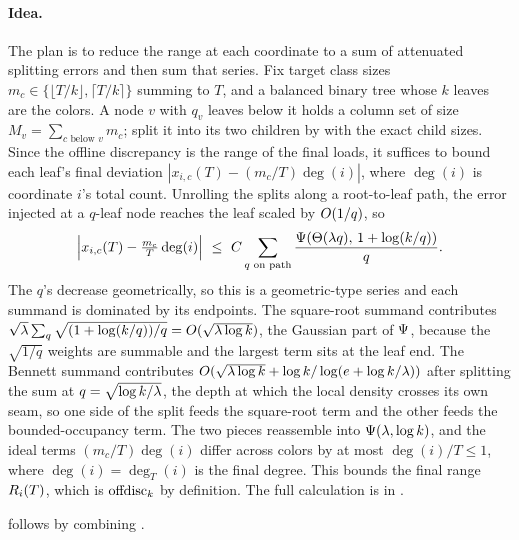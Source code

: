 \paragraph{Idea.}
The plan is to reduce the range at each coordinate to a sum of attenuated splitting errors and then sum that series.
Fix target class sizes $m_c\in\{\lfloor T/k\rfloor,\lceil T/k\rceil\}$ summing to $T$, and a balanced binary tree whose $k$
leaves are the colors. A node $v$ with $q_v$ leaves below it holds a column set of size $M_v=\sum_{c\text{ below }v}m_c$;
split it into its two children by  with the exact child sizes. Since the offline discrepancy is the range of
the final loads, it suffices to bound each leaf's final deviation $|x_{i,c}(T)-(m_c/T)\deg(i)|$, where $\deg(i)$ is
coordinate $i$'s total count. Unrolling the splits along a root-to-leaf path, the error injected at a $q$-leaf node reaches
the leaf scaled by $O(1/q)$, so
\[
  \Big|x_{i,c}(T)-\tfrac{m_c}{T}\deg(i)\Big|\ \le\ C\sum_{q\text{ on path}}\frac{\Psifn(\Th(\lam q),\,1+\log(k/q))}{q}.
\]
The $q$'s decrease geometrically, so this is a geometric-type series and each summand is dominated by its endpoints. The
square-root summand contributes
$\sqrt{\lambda}\sum_q\sqrt{(1+\log(k/q))/q}=O(\sqrt{\lambda\log k})$, the Gaussian part of $\Psi$, because the
$\sqrt{1/q}$ weights are summable and the largest term sits at the leaf end. The Bennett summand contributes
$O(\sqrt{\lambda\log k}+\log k/\log(e+\log k/\lambda))$ after splitting the sum at $q=\sqrt{\log k/\lambda}$, the depth at which the
local density crosses its own seam, so one side of the split feeds the square-root term and the other feeds the
bounded-occupancy term. The two pieces
reassemble into $\Psi(\lambda,\log k)$, and the ideal terms $(m_c/T)\deg(i)$ differ across colors by at most
$\deg(i)/T\le 1$, where $\deg(i)=\deg_T(i)$ is the final degree. This bounds the final range $R_i(T)$, which is
$\mathrm{offdisc}_k$ by definition. The full calculation is in .

\medskip
{} follows by combining .
